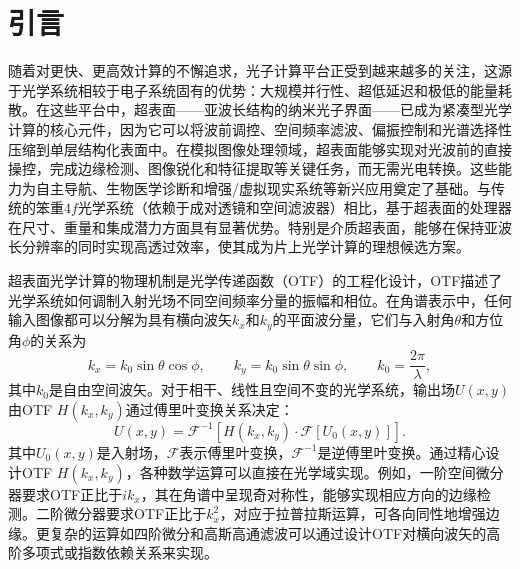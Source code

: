 \section{引言}

随着对更快、更高效计算的不懈追求，光子计算平台正受到越来越多的关注，这源于光学系统相较于电子系统固有的优势：大规模并行性、超低延迟和极低的能量耗散\cite{shastri2021photonics,prucnal2016recent,wetzstein2020inference}。在这些平台中，超表面——亚波长结构的纳米光子界面——已成为紧凑型光学计算的核心元件，因为它可以将波前调控、空间频率滤波、偏振控制和光谱选择性压缩到单层结构化表面中\cite{yu2014,koenderink2015,genevet2017,kamali2018review,chen2022review}。在模拟图像处理领域，超表面能够实现对光波前的直接操控，完成边缘检测、图像锐化和特征提取等关键任务，而无需光电转换\cite{silva2014,zhu2017,guo2018laplace,kwon2018,cordaro2019}。这些能力为自主导航、生物医学诊断和增强/虚拟现实系统等新兴应用奠定了基础\cite{wang2020metasurface,zhou2022flat}。与传统的笨重$4f$光学系统（依赖于成对透镜和空间滤波器）相比，基于超表面的处理器在尺寸、重量和集成潜力方面具有显著优势\cite{goodman2017,bykov2018optica}。特别是介质超表面，能够在保持亚波长分辨率的同时实现高透过效率，使其成为片上光学计算的理想候选方案\cite{decker2015high,west2014all}。

超表面光学计算的物理机制是光学传递函数（OTF）的工程化设计，OTF描述了光学系统如何调制入射光场不同空间频率分量的振幅和相位\cite{goodman2017,wesemann2021review}。在角谱表示中，任何输入图像都可以分解为具有横向波矢$k_x$和$k_y$的平面波分量，它们与入射角$\theta$和方位角$\phi$的关系为
\[
k_x = k_0 \sin\theta \cos\phi, \qquad
k_y = k_0 \sin\theta \sin\phi, \qquad
k_0 = \frac{2\pi}{\lambda},
\]
其中$k_0$是自由空间波矢\cite{goodman2017}。对于相干、线性且空间不变的光学系统，输出场$U(x,y)$由OTF $H(k_x, k_y)$通过傅里叶变换关系决定：
\[
U(x,y) = \mathcal{F}^{-1}\left[H(k_x, k_y) \cdot \mathcal{F}[U_0(x,y)]\right].
\]
其中$U_0(x,y)$是入射场，$\mathcal{F}$表示傅里叶变换，$\mathcal{F}^{-1}$是逆傅里叶变换。通过精心设计OTF $H(k_x, k_y)$，各种数学运算可以直接在光学域实现。例如，一阶空间微分器要求OTF正比于$ik_x$，其在角谱中呈现奇对称性，能够实现相应方向的边缘检测\cite{silva2014,bykov2018optica}。二阶微分器要求OTF正比于$k_x^2$，对应于拉普拉斯运算，可各向同性地增强边缘\cite{zhu2017,zhou2025laplace}。更复杂的运算如四阶微分\cite{qiu2025highorder}和高斯高通滤波\cite{zhou2023tailoring}可以通过设计OTF对横向波矢的高阶多项式或指数依赖关系来实现。

